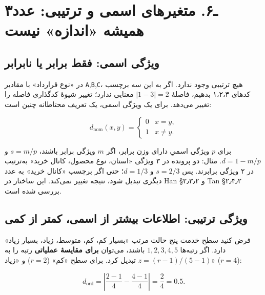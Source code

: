 \documentclass[12pt,a4paper,oneside]{book}
\begin{document}
\section{۳ـ۶. متغیرهای اسمی و ترتیبی: عدد همیشه «اندازه» نیست}\label{ux640ux6f6.-ux645ux62aux63aux6ccux631ux647ux627ux6cc-ux627ux633ux645ux6cc-ux648-ux62aux631ux62aux6ccux628ux6cc-ux639ux62fux62f-ux647ux645ux6ccux634ux647-ux627ux646ux62fux627ux632ux647-ux646ux6ccux633ux62a}

\subsection{ویژگی اسمی: فقط برابر یا نابرابر}\label{ux648ux6ccux698ux6afux6cc-ux627ux633ux645ux6cc-ux641ux642ux637-ux628ux631ux627ux628ux631-ux6ccux627-ux646ux627ux628ux631ux627ux628ux631}

در «نوع قرارداد» با مقادیر \texttt{A},\texttt{B},\texttt{C}، هیچ ترتیبی وجود ندارد. اگر به این سه برچسب کدهای ۱،۲،۳ بدهیم، فاصلهٔ \(|1-3|=2\) معنایی ندارد؛ تغییر شیوهٔ کدگذاری فاصله را تغییر می‌دهد. برای یک ویژگی اسمی، یک تعریف محتاطانه چنین است:

\[
d_{\mathrm{nom}}(x,y)=\begin{cases}0&x=y,\\1&x\ne y.\end{cases}
\]

برای \(p\) ویژگی اسمیِ دارای وزن برابر، اگر \(m\) ویژگی برابر باشند، \(s=m/p\) و \(d=1-m/p\). مثال: دو پرونده در ۳ ویژگی «استان، نوع محصول، کانال خرید» به‌ترتیب در ۲ ویژگی برابرند. پس \(s=2/3\) و \(d=1/3\)؛ حتی اگر برچسب «کانال خرید» به عدد دیگری تبدیل شود، نتیجه تغییر نمی‌کند. این ساختار در Han §۲٫۳٫۲ و Tan §۲٫۴٫۲ بررسی شده است.

\subsection{ویژگی ترتیبی: اطلاعات بیشتر از اسمی، کمتر از کمی}\label{ux648ux6ccux698ux6afux6cc-ux62aux631ux62aux6ccux628ux6cc-ux627ux637ux644ux627ux639ux627ux62a-ux628ux6ccux634ux62aux631-ux627ux632-ux627ux633ux645ux6cc-ux6a9ux645ux62aux631-ux627ux632-ux6a9ux645ux6cc}

فرض کنید سطح خدمت پنج حالت مرتب «بسیار کم، کم، متوسط، زیاد، بسیار زیاد» دارد. اگر رتبه‌ها \(1,2,3,4,5\) باشند، می‌توان \textbf{برای مقایسهٔ عملیاتی} رتبه را به \(z=(r-1)/(5-1)\) تبدیل کرد. برای سطح «کم» (\(r=2\)) و «زیاد» (\(r=4\)):

\[
d_{\mathrm{ord}}=\left|\frac{2-1}{4}-\frac{4-1}{4}\right|=\frac{2}{4}=0.5.
\]
\end{document}
